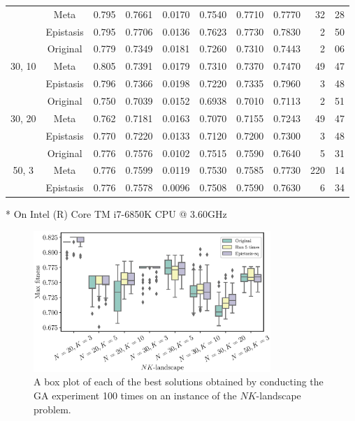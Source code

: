 \begin{table}[H]
\begin{threeparttable}
\begin{tabular}{ccccccccr@{:}l}
							& Meta      & 0.795 & 0.7661 & 0.0170 & 0.7540 & 0.7710 & 0.7770 & 32 & 28 \\
							& Epistasis & 0.795 & 0.7706 & 0.0136 & 0.7623 & 0.7730 & 0.7830 & 2 & 50 \\
	\midrule
	\multirow{3}{*}{30, 10}	& Original  & 0.779 & 0.7349 & 0.0181 & 0.7260 & 0.7310 & 0.7443 & 2 & 06 \\
							& Meta      & 0.805 & 0.7391 & 0.0179 & 0.7310 & 0.7370 & 0.7470 & 49 & 47 \\
							& Epistasis & 0.796 & 0.7366 & 0.0198 & 0.7220 & 0.7335 & 0.7960 & 3 & 48 \\
	\midrule
	\multirow{3}{*}{30, 20}	& Original  & 0.750 & 0.7039 & 0.0152 & 0.6938 & 0.7010 & 0.7113 & 2 & 51 \\
							& Meta      & 0.762 & 0.7181 & 0.0163 & 0.7070 & 0.7155 & 0.7243 & 49 & 47 \\
							& Epistasis & 0.770 & 0.7220 & 0.0133 & 0.7120 & 0.7200 & 0.7300 & 3 & 48 \\
	\midrule
	\multirow{3}{*}{50, 3}	& Original  & 0.776 & 0.7576 & 0.0102 & 0.7515 & 0.7590 & 0.7640 & 5 & 31 \\
							& Meta      & 0.776 & 0.7599 & 0.0119 & 0.7530 & 0.7585 & 0.7730 & 220 & 14 \\
							& Epistasis & 0.776 & 0.7578 & 0.0096 & 0.7508 & 0.7590 & 0.7630 & 6 & 34 \\
	\bottomrule
	\end{tabular}
	\begin{tablenotes}
		\footnotesize
		\item[*] On Intel (R) Core TM i7-6850K CPU @ 3.60GHz
	\end{tablenotes}
	\end{threeparttable}
\end{table}


\begin{figure}[H]
	\centering
	\includegraphics[width=0.8\textwidth]{./boxplot_NK}
	\caption{A box plot of each of the best solutions obtained by conducting the GA experiment 100 times on an instance of the $ NK $-landscape problem.} \label{fig:boxplot_nk}
\end{figure}

